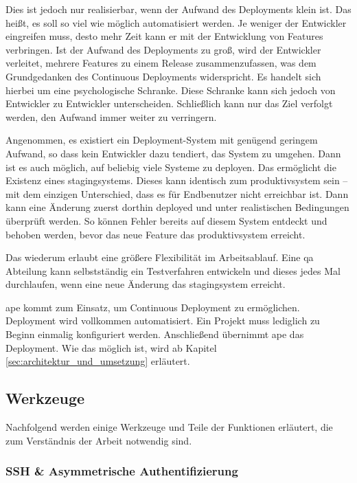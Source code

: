 Dies ist jedoch nur realisierbar, wenn der Aufwand des Deployments klein ist. Das heißt, es soll so viel wie möglich automatisiert werden. Je weniger der Entwickler eingreifen muss, desto mehr Zeit kann er mit der Entwicklung von Features verbringen. Ist der Aufwand des Deployments zu groß, wird der Entwickler verleitet, mehrere Features zu einem Release zusammenzufassen, was dem Grundgedanken des Continuous Deployments widerspricht. Es handelt sich hierbei um eine psychologische Schranke. Diese Schranke kann sich jedoch von Entwickler zu Entwickler unterscheiden. Schließlich kann nur das Ziel verfolgt werden, den Aufwand immer weiter zu verringern.

Angenommen, es existiert ein Deployment-System mit genügend geringem Aufwand, so dass kein Entwickler dazu tendiert, das System zu umgehen. Dann ist es auch möglich, auf beliebig viele Systeme zu deployen. Das ermöglicht die Existenz eines \glspl{stagingsystem}. Dieses kann identisch zum \gls{produktivsystem} sein -- mit dem einzigen Unterschied, dass es für Endbenutzer nicht erreichbar ist. Dann kann eine Änderung zuerst dorthin deployed und unter realistischen Bedingungen überprüft werden. So können Fehler bereits auf diesem System entdeckt und behoben werden, bevor das neue Feature das \gls{produktivsystem} erreicht.

Das wiederum erlaubt eine größere Flexibilität im Arbeitsablauf. Eine \gls{qa} Abteilung kann selbstständig ein Testverfahren entwickeln und dieses jedes Mal durchlaufen, wenn eine neue Änderung das \gls{stagingsystem} erreicht.

\gls{ape} kommt zum Einsatz, um Continuous Deployment zu ermöglichen. Deployment wird vollkommen automatisiert. Ein Projekt muss lediglich zu Beginn einmalig konfiguriert werden. Anschließend übernimmt \gls{ape} das Deployment. Wie das möglich ist, wird ab Kapitel \ref{sec:architektur_und_umsetzung} erläutert.



\subsection{Werkzeuge} %
\label{sub:werkzeuge}

Nachfolgend werden einige Werkzeuge und Teile der Funktionen erläutert, die zum Verständnis der Arbeit notwendig sind.

\subsubsection{SSH \& Asymmetrische Authentifizierung} %
\label{ssub:ssh_&_asymmetrische_authentifizierung}

